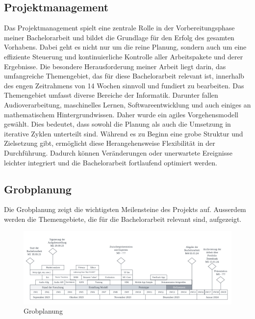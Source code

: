 \documentclass[main.tex]{subfiles} %
\begin{document}
\subsection{Projektmanagement}
Das Projektmanagement spielt eine zentrale Rolle in der Vorbereitungsphase meiner Bachelorarbeit 
und bildet die Grundlage für den Erfolg des gesamten Vorhabens. Dabei geht es nicht nur um die 
reine Planung, sondern auch um eine effiziente Steuerung und kontinuierliche Kontrolle aller 
Arbeitspakete und derer Ergebnisse. Die besondere Herausforderung meiner Arbeit liegt darin, 
das umfangreiche Themengebiet, das für diese Bachelorarbeit relevant ist, innerhalb des engen 
Zeitrahmens von 14 Wochen sinnvoll und fundiert zu bearbeiten. Das Themengebiet umfasst diverse 
Bereiche der Informatik. Darunter fallen Audioverarbeitung, maschinelles Lernen, 
Softwareentwicklung und auch einiges an mathematischem Hintergrundwissen. Daher wurde ein agiles 
Vorgehensmodell gewählt. Dies bedeutet, dass sowohl die Planung als auch die Umsetzung in iterative 
Zyklen unterteilt sind. Während es zu Beginn eine grobe Struktur und Zielsetzung gibt, ermöglicht 
diese Herangehensweise Flexibilität in der Durchführung. Dadurch können Veränderungen oder 
unerwartete Ereignisse leichter integriert und die Bachelorarbeit fortlaufend optimiert werden.

\subsection{Grobplanung}
Die Grobplanung zeigt die wichtigsten Meilensteine des Projekts auf. Ausserdem werden die 
Themengebiete, die für die Bachelorarbeit relevant sind, aufgezeigt.

\begin{figure}[h]
    \hspace{-0.075\linewidth} %
    \includegraphics[width=1.15\linewidth]{img/projectplan.pdf}
    \caption{Grobplanung}
    \label{fig:grobplanung}
\end{figure}
\end{document}
